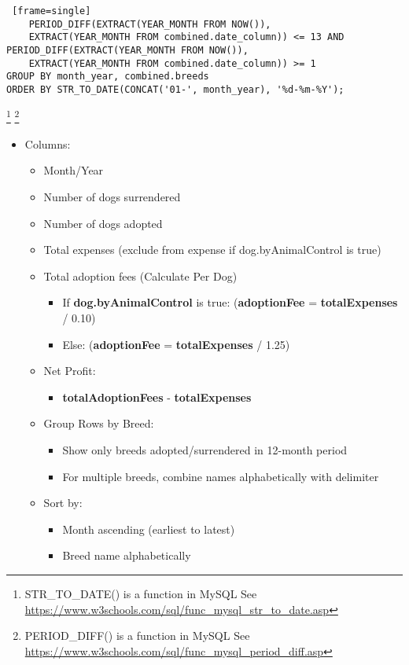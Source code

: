 \documentclass{article}
\begin{document}
\begin{itemize}
\begin{Verbatim} [frame=single]
    PERIOD_DIFF(EXTRACT(YEAR_MONTH FROM NOW()), 
    EXTRACT(YEAR_MONTH FROM combined.date_column)) <= 13 AND 
PERIOD_DIFF(EXTRACT(YEAR_MONTH FROM NOW()), 
    EXTRACT(YEAR_MONTH FROM combined.date_column)) >= 1
GROUP BY month_year, combined.breeds 
ORDER BY STR_TO_DATE(CONCAT('01-', month_year), '%d-%m-%Y');
\end{Verbatim}
\footnote{STR\_TO\_DATE() is a function in MySQL See \url{https://www.w3schools.com/sql/func_mysql_str_to_date.asp}}
\footnote{PERIOD\_DIFF() is a function in MySQL See  \url{https://www.w3schools.com/sql/func_mysql_period_diff.asp}}
\begin{itemize}
    \item Columns:
    \begin{itemize}
        \item Month/Year
        \item Number of dogs surrendered
        \item Number of dogs adopted
        \item Total expenses (exclude from expense if dog.byAnimalControl is true)
        \item Total adoption fees (Calculate Per Dog)
        \begin{itemize}
            \item If \textbf{dog.byAnimalControl} is true: (\textbf{adoptionFee} = \textbf{totalExpenses} / 0.10)
            \item Else: (\textbf{adoptionFee} = \textbf{totalExpenses} / 1.25)
        \end{itemize}
        \item Net Profit:
        \begin{itemize}
            \item \textbf{totalAdoptionFees} - \textbf{totalExpenses}
        \end{itemize}
        \item Group Rows by Breed:
        \begin{itemize}
            \item Show only breeds adopted/surrendered in 12-month period
            \item For multiple breeds, combine names alphabetically with delimiter
        \end{itemize}
        \item Sort by:
        \begin{itemize}
            \item Month ascending (earliest to latest)
            \item Breed name alphabetically
        \end{itemize}
    \end{itemize}
\end{itemize}        
\end{itemize}    
\end{document}
